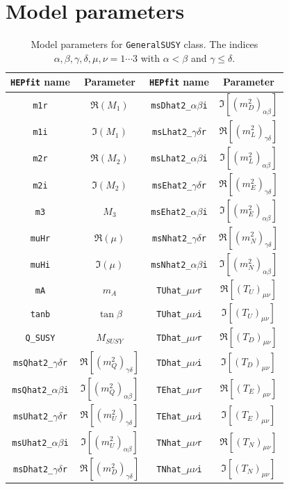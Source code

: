 \documentclass[preprint,3p,12pt]{elsarticle}
\newcommand{\HEPfit}{\texttt{HEPfit}\xspace}
\begin{document}
{\appendix

\section{Model parameters}
\label{sec:appModelParameters}


\begin{table}[t]
\begin{center}
\begin{tabular}{|c|c||c|c|}
\hline
\HEPfit name & Parameter & \HEPfit name & Parameter \\
\hline
\texttt{m1r} & $\Re(M_{1})$ & \texttt{msDhat2\_$\alpha\beta$i} & $\Im[(m_{D}^{2})_{\alpha\beta}]$ \\
\texttt{m1i} & $\Im(M_{1})$ & \texttt{msLhat2\_$\gamma\delta$r} & $\Re[(m_{L}^{2})_{\gamma\delta}]$ \\
\texttt{m2r} & $\Re(M_{2})$ & \texttt{msLhat2\_$\alpha\beta$i} & $\Im[(m_{L}^{2})_{\alpha\beta}]$ \\
\texttt{m2i} & $\Im(M_{2})$ & \texttt{msEhat2\_$\gamma\delta$r} & $\Re[(m_{E}^{2})_{\gamma\delta}]$  \\
\texttt{m3} &  $M_{3}$ & \texttt{msEhat2\_$\alpha\beta$i} & $\Im[(m_{E}^{2})_{\alpha\beta}]$ \\
\texttt{muHr} & $\Re(\mu)$ & \texttt{msNhat2\_$\gamma\delta$r} & $\Re[(m_{N}^{2})_{\gamma\delta}]$ \\
\texttt{muHi} & $\Im(\mu)$ & \texttt{msNhat2\_$\alpha\beta$i} & $\Im[(m_{N}^{2})_{\alpha\beta}]$  \\
\texttt{mA} & $m_{A}$ & \texttt{TUhat\_$\mu\nu$r} & $\Re[(T_{U})_{\mu\nu}]$ \\
\texttt{tanb} & $\tan\beta$ & \texttt{TUhat\_$\mu\nu$i} & $\Im[(T_{U})_{\mu\nu}]$ \\
\texttt{Q\_SUSY} & $M_{SUSY}$ & \texttt{TDhat\_$\mu\nu$r} & $\Re[(T_{D})_{\mu\nu}]$ \\
\texttt{msQhat2\_$\gamma\delta$r} & $\Re[(m_{Q}^{2})_{\gamma\delta}]$ & \texttt{TDhat\_$\mu\nu$i} & $\Im[(T_{D})_{\mu\nu}]$ \\
\texttt{msQhat2\_$\alpha\beta$i} & $\Im[(m_{Q}^{2})_{\alpha\beta}]$ & \texttt{TEhat\_$\mu\nu$r} & $\Re[(T_{E})_{\mu\nu}]$ \\
\texttt{msUhat2\_$\gamma\delta$r} & $\Re[(m_{U}^{2})_{\gamma\delta}]$ & \texttt{TEhat\_$\mu\nu$i} & $\Im[(T_{E})_{\mu\nu}]$\\
\texttt{msUhat2\_$\alpha\beta$i} & $\Im[(m_{U}^{2})_{\alpha\beta}]$ & \texttt{TNhat\_$\mu\nu$r} & $\Re[(T_{N})_{\mu\nu}]$ \\
\texttt{msDhat2\_$\gamma\delta$r} & $\Re[(m_{D}^{2})_{\gamma\delta}]$ & \texttt{TNhat\_$\mu\nu$i} & $\Im[(T_{N})_{\mu\nu}]$ \\ 
\hline
\end{tabular}
\end{center}
\caption{Model parameters for \texttt{GeneralSUSY} class. The indices $\alpha, \beta, \gamma, \delta, \mu, \nu = 1 \cdots 3$ with $\alpha<\beta$ and $\gamma \leq \delta$.}
\label{default}
\end{table}%

}
\end{document}
